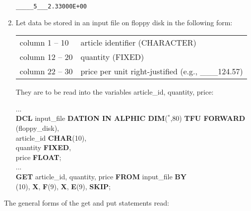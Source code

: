 \begin{enumerate}
\begin{verbatim}
_____5___2.33000E+00
\end{verbatim}
\item Let data be stored in an input file on floppy disk in the
following form:

\begin{tabular}{l@{:}l}
column  1 -- 10 & article identifier (CHARACTER)\\
column 12 -- 20 & quantity (FIXED)\\
column 22 -- 30 & price per unit right-justified (e.g., \_\_\_124.57)
\end{tabular}

They are to be read into the variables article\_id, quantity, price:

...\\
{\bf DCL} input\_file {\bf DATION IN ALPHIC DIM}($^*$,80) {\bf TFU FORWARD}\\
\x {} (floppy\_disk),\\
\x article\_id {\bf CHAR}(10),\\
\x quantity {\bf FIXED},\\
\x price {\bf FLOAT};\\
...\\
{\bf GET} article\_id, quantity, price {\bf FROM} input\_file {\bf BY}\\
(10), {\bf X}, {\bf F}(9), {\bf X}, {\bf E}(9), {\bf SKIP};
\end{enumerate}

The general forms of the get and put statements read:




